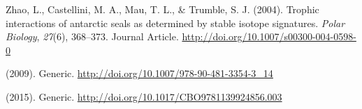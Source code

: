 \documentclass [11pt, proquest] {uwthesis}[2015/03/03]
\begin{document}
\hypertarget{ref-Zhao2004}{}
Zhao, L., Castellini, M. A., Mau, T. L., \& Trumble, S. J. (2004).
Trophic interactions of antarctic seals as determined by stable isotope
signatures. \emph{Polar Biology}, \emph{27}(6), 368--373. Journal
Article. \url{http://doi.org/10.1007/s00300-004-0598-0}

\hypertarget{ref-Graham2010}{}
(2009). Generic. \url{http://doi.org/10.1007/978-90-481-3354-3_14}

\hypertarget{ref-Du2015}{}
(2015). Generic. \url{http://doi.org/10.1017/CBO9781139924856.003}
\end{document}
